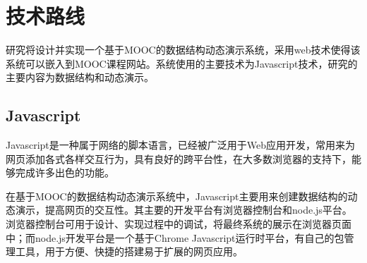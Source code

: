 \chapter{技术路线}
\begin{chatext}
研究将设计并实现一个基于MOOC的数据结构动态演示系统，采用web技术使得该系统可以嵌入到MOOC课程网站。系统使用的主要技术为Javascript技术，研究的主要内容为数据结构和动态演示。
\end{chatext}
\section{Javascript}
\begin{sectext}
Javascript是一种属于网络的脚本语言，已经被广泛用于Web应用开发，常用来为网页添加各式各样交互行为，具有良好的跨平台性，在大多数浏览器的支持下，能够完成许多出色的功能。

在基于MOOC的数据结构动态演示系统中，Javascript主要用来创建数据结构的动态演示，提高网页的交互性。其主要的开发平台有浏览器控制台和node.js平台。浏览器控制台可用于设计、实现过程中的调试，将最终系统的展示在浏览器页面中；而node.js开发平台是一个基于Chrome Javascript运行时平台，有自己的包管理工具，用于方便、快捷的搭建易于扩展的网页应用。
\end{sectext}
